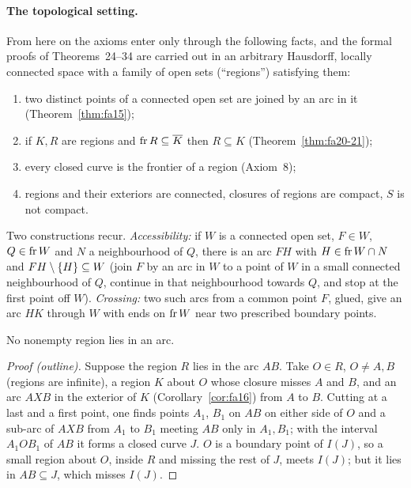 \paragraph{The topological setting.} From here on the axioms enter only through the following facts, and
the formal proofs of Theorems~24--34 are carried out in an arbitrary Hausdorff, locally connected space
with a family of open sets (``regions'') satisfying them:
\begin{enumerate}[label=(T\arabic*)]
\item two distinct points of a connected open set are joined by an arc in it (Theorem~\ref{thm:fa15});
\item if $K,R$ are regions and $\operatorname{fr} R\subseteq\overline{K}$ then $R\subseteq K$ (Theorem~\ref{thm:fa20-21});
\item every closed curve is the frontier of a region (Axiom~8);
\item regions and their exteriors are connected, closures of regions are compact, $S$ is not compact.
\end{enumerate}


Two constructions recur. \emph{Accessibility:} if $W$ is a connected open set, $F\in W$, $Q\in\operatorname{fr} W$ and
$N$ a neighbourhood of $Q$, there is an arc $FH$ with $H\in\operatorname{fr} W\cap N$ and $FH\setminus\left\{ H \right\}\subseteq W$ (join
$F$ by an arc in $W$ to a point of $W$ in a small connected neighbourhood of $Q$, continue in that
neighbourhood towards $Q$, and stop at the first point off $W$). \emph{Crossing:} two such arcs from a
common point $F$, glued, give an arc $HK$ through $W$ with ends on $\operatorname{fr} W$ near two prescribed boundary
points.


\begin{theorem}[F.A.\ Theorem~23]\label{thm:fa23}
No nonempty region lies in an arc.
\end{theorem}

\begin{proof}[Proof (outline)]
Suppose the region $R$ lies in the arc $AB$. Take $O\in R$, $O\ne A,B$ (regions are infinite), a region $K$
about $O$ whose closure misses $A$ and $B$, and an arc $AXB$ in the exterior of $K$
(Corollary~\ref{cor:fa16}) from $A$ to $B$. Cutting at a last and a first point, one finds points $A_1$, $B_1$
on $AB$ on either side of $O$ and a sub-arc of $AXB$ from $A_1$ to $B_1$ meeting $AB$ only in $A_1,B_1$; with
the interval $A_1OB_1$ of $AB$ it forms a closed curve $J$. $O$ is a boundary point of $I(J)$, so a small region
about $O$, inside $R$ and missing the rest of $J$, meets $I(J)$; but it lies in $AB\subseteq J$, which misses
$I(J)$.
\end{proof}

